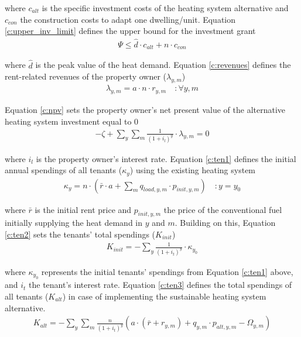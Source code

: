 where $c_{alt}$ is the specific investment costs of the heating system alternative and $c_{con}$ the construction costs to adapt one dwelling/unit. Equation \ref{c:upper_inv_limit} defines the upper bound for the investment grant 
\begin{align}\label{c:upper_inv_limit}
\Psi \leq \hat{d} \cdot c_{alt} + n \cdot c_{con}
\end{align}

where $\hat{d}$ is the peak value of the heat demand. Equation \ref{c:revenues} defines the rent-related revenues of the property owner ($\lambda_{y,m}$)
\begin{align}\label{c:revenues}
\lambda_{y,m} = a \cdot n \cdot r_{y,m} \quad :\forall y,m
\end{align}

 Equation \ref{c:npv} sets the property owner's net present value of the alternative heating system investment equal to 0
\begin{align}\label{c:npv}
-\zeta + \sum_{y} \sum_{m} \frac{1}{(1+i_l)^y} \cdot \lambda_{y,m} = 0
\end{align}

where $i_l$ is the property owner's interest rate.  Equation \ref{c:ten1} defines the initial annual spendings of all tenants ($\kappa_{y}$) using the existing heating system 
\begin{align}\label{c:ten1}
\kappa_{y} = n \cdot (\bar{r} \cdot a + \sum_{m} q_{load,y,m} \cdot p_{init,y,m}) \quad :y=y_0
\end{align}

where $\bar{r}$ is the initial rent price and $p_{init,y,m}$ the price of the conventional fuel initially supplying the heat demand in $y$ and $m$. Building on this, Equation \ref{c:ten2} sets the tenants' total spendings ($K_{init}$)
\begin{align}\label{c:ten2}
K_{init} = -\sum_{y} \frac{1}{(1+i_{t})^y} \cdot \kappa_{y_0}
\end{align}

where $\kappa_{y_0}$ represents the initial tenants' spendings from Equation \ref{c:ten1} above, and $i_t$ the tenant's interest rate. Equation \ref{c:ten3} defines the total spendings of all tenants ($K_{alt}$) in case of implementing the sustainable heating system alternative.
\begin{align}\label{c:ten3}
	K_{alt} = -\sum_{y} \sum_{m} \frac{n}{(1+i_{t})^y} \left(a \cdot (\bar{r} + r_{y,m}) + q_{y,m} \cdot p_{alt,y,m}-\Omega_{y,m} \right)
\end{align}

